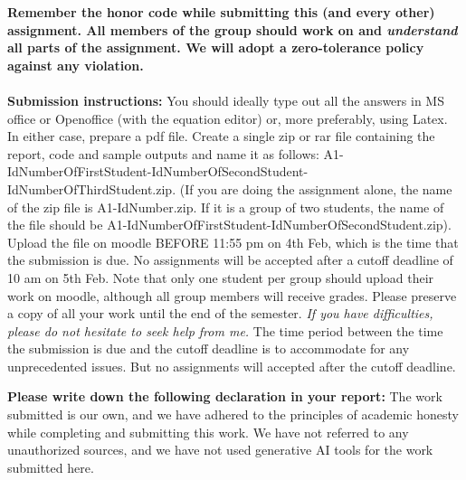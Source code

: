 \documentclass[11pt]{article}
\begin{document}
\maketitle

\textbf{Remember the honor code while submitting this (and every other) assignment. All members of the group should work on and \emph{understand} all parts of the assignment. We will adopt a \textbf{zero-tolerance policy} against any violation.}
\\
\\
\textbf{Submission instructions:} You should ideally type out all the answers in MS office or Openoffice (with the equation editor) or, more preferably, using Latex. In either case, prepare a pdf file. Create a single zip or rar file containing the report, code and sample outputs and name it as follows: A1-IdNumberOfFirstStudent-IdNumberOfSecondStudent-IdNumberOfThirdStudent.zip. (If you are doing the assignment alone, the name of the zip file is A1-IdNumber.zip. If it is a group of two students, the name of the file should be  A1-IdNumberOfFirstStudent-IdNumberOfSecondStudent.zip). Upload the file on moodle BEFORE 11:55 pm on 4th Feb, which is the time that the submission is due. No assignments will be accepted after a cutoff deadline of 10 am on 5th Feb. Note that only one student per group should upload their work on moodle, although all group members will receive grades. Please preserve a copy of all your work until the end of the semester. \emph{If you have difficulties, please do not hesitate to seek help from me.} The time period between the time the submission is due and the cutoff deadline is to accommodate for any unprecedented issues. But no assignments will accepted after the cutoff deadline. 

\textbf{Please write down the following declaration in your report:} The work submitted is our own, and we have adhered to the principles of academic honesty while completing and submitting this work. We have not referred to any unauthorized sources, and we have not used generative AI tools for the work submitted here. 
\end{document}
